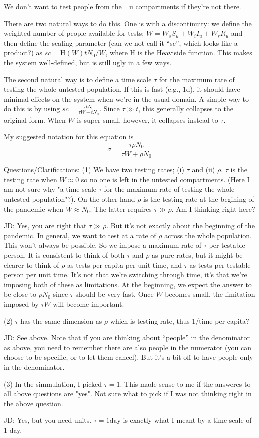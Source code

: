 We don't want to test people from the \_u compartments if they're not there.

There are two natural ways to do this. One is with a discontinuity: we define 
the weighted number of people available for tests: $W = W_s S_u + W_i I_u + W_r R_u$ and then define the scaling parameter (can we not call it ``sc'', which looks like a product?) as $sc = \textrm{H}(W) tN_0/W$, where H is the Heaviside function. This makes the system well-defined, but is still ugly in a few ways.

The second natural way is to define a time scale $\tau$ for the maximum rate of testing the whole untested population. If this is fast (e.g., 1d), it should have minimal effects on the system when we're in the usual domain. A simple way to do this is by using $sc = \frac{\tau tN_0}{\tau W + t N_0}$. Since $\tau \gg t$, this generally collapses to the original form. When $W$ is super-small, however, it collapses instead to $\tau$.

My suggested notation for this equation is $$\sigma = \frac{\tau \rho N_0}{\tau W + \rho N_0}$$

Questions/Clarifications:
(1) We have two testing rates; (i) $\tau$ and (ii) $\rho$.
$\tau$ is the testing rate when $W \approx 0$ so no one is left in the untested compartments. (Here I am not sure why "a time scale $\tau$ for the maximum rate of testing the whole untested population"?).
On the other hand $\rho$ is the testing rate at the begining of the pandemic when $W \approx N_0$. The latter requires $\tau \gg \rho$. Am I thinking right here?  

JD: Yes, you are right that $\tau \gg \rho$. But it's not exactly about the beginning of the pandemic. In general, we want to test at a rate of $\rho$ across the whole population. This won't always be possible. So we impose a maximum rate of $\tau$ per testable person. It is consistent to think of both $\tau$ and $\rho$ as pure rates, but it might be clearer to think of $\rho$ as tests per capita per unit time, and $\tau$ as tests per testable person per unit time. It's not that we're switching through time, it's that we're imposing both of these as limitations. At the beginning, we expect the answer to be close to $\rho N_0$ since $\tau$ should be very fast. Once $W$ becomes small, the limitation imposed by $\tau W$ will become important.

(2) $\tau$ has the same dimension as $\rho$ which is testing rate, thus 1/time per capita?

JD: See above. Note that if you are thinking about ``people'' in the denominator as above, you need to remember there are also people in the numerator (you can choose to be specific, or to let them cancel). But it's a bit off to have people only in the denominator.

(3) In the simmulation, I picked $\tau=1$. This made sense to me if the answeres to all above questions are "yes". Not sure what to pick if I was not thinking right in the above question.

JD: Yes, but you need units. $\tau = 1 \mathrm{day}$ is exactly what I meant by a time scale of 1 day. 

